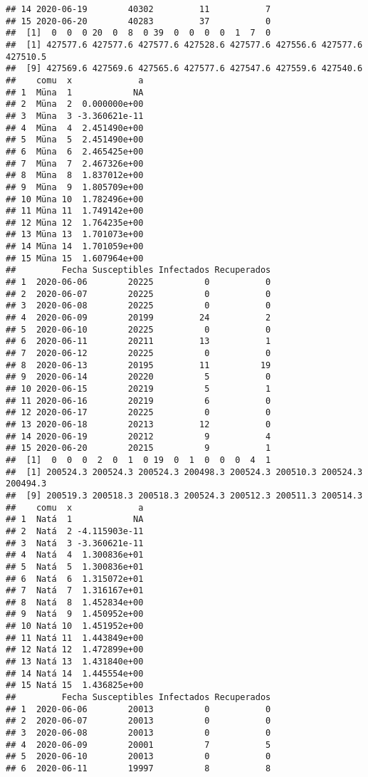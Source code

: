 \documentclass[
]{article}
\begin{document}
\begin{verbatim}
## 14 2020-06-19        40302         11           7
## 15 2020-06-20        40283         37           0
##  [1]  0  0  0 20  0  8  0 39  0  0  0  0  1  7  0
##  [1] 427577.6 427577.6 427577.6 427528.6 427577.6 427556.6 427577.6 427510.5
##  [9] 427569.6 427569.6 427565.6 427577.6 427547.6 427559.6 427540.6
##    comu  x             a
## 1  Müna  1            NA
## 2  Müna  2  0.000000e+00
## 3  Müna  3 -3.360621e-11
## 4  Müna  4  2.451490e+00
## 5  Müna  5  2.451490e+00
## 6  Müna  6  2.465425e+00
## 7  Müna  7  2.467326e+00
## 8  Müna  8  1.837012e+00
## 9  Müna  9  1.805709e+00
## 10 Müna 10  1.782496e+00
## 11 Müna 11  1.749142e+00
## 12 Müna 12  1.764235e+00
## 13 Müna 13  1.701073e+00
## 14 Müna 14  1.701059e+00
## 15 Müna 15  1.607964e+00
##         Fecha Susceptibles Infectados Recuperados
## 1  2020-06-06        20225          0           0
## 2  2020-06-07        20225          0           0
## 3  2020-06-08        20225          0           0
## 4  2020-06-09        20199         24           2
## 5  2020-06-10        20225          0           0
## 6  2020-06-11        20211         13           1
## 7  2020-06-12        20225          0           0
## 8  2020-06-13        20195         11          19
## 9  2020-06-14        20220          5           0
## 10 2020-06-15        20219          5           1
## 11 2020-06-16        20219          6           0
## 12 2020-06-17        20225          0           0
## 13 2020-06-18        20213         12           0
## 14 2020-06-19        20212          9           4
## 15 2020-06-20        20215          9           1
##  [1]  0  0  0  2  0  1  0 19  0  1  0  0  0  4  1
##  [1] 200524.3 200524.3 200524.3 200498.3 200524.3 200510.3 200524.3 200494.3
##  [9] 200519.3 200518.3 200518.3 200524.3 200512.3 200511.3 200514.3
##    comu  x             a
## 1  Natá  1            NA
## 2  Natá  2 -4.115903e-11
## 3  Natá  3 -3.360621e-11
## 4  Natá  4  1.300836e+01
## 5  Natá  5  1.300836e+01
## 6  Natá  6  1.315072e+01
## 7  Natá  7  1.316167e+01
## 8  Natá  8  1.452834e+00
## 9  Natá  9  1.450952e+00
## 10 Natá 10  1.451952e+00
## 11 Natá 11  1.443849e+00
## 12 Natá 12  1.472899e+00
## 13 Natá 13  1.431840e+00
## 14 Natá 14  1.445554e+00
## 15 Natá 15  1.436825e+00
##         Fecha Susceptibles Infectados Recuperados
## 1  2020-06-06        20013          0           0
## 2  2020-06-07        20013          0           0
## 3  2020-06-08        20013          0           0
## 4  2020-06-09        20001          7           5
## 5  2020-06-10        20013          0           0
## 6  2020-06-11        19997          8           8

\end{verbatim}
\end{document}
